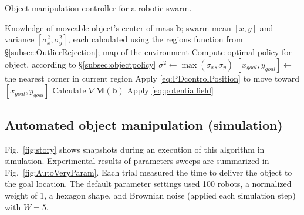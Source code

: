 \begin{algorithm}
\caption{Object-manipulation controller for a robotic swarm.}\label{alg:BlockPushing}
\begin{algorithmic}[1]
\Require Knowledge of moveable object's center of mass $\mathbf{b}$; swarm mean $[\bar{x},\bar{y}]$ and variance $[\sigma_x^2, \sigma_y^2]$, each calculated using the regions function from \S \ref{subsec:OutlierRejection};  map of the environment
\State Compute optimal policy for object, according to \S \ref{subsec:objectpolicy}
\State $\sigma^2 \gets \max{(\sigma_x,\sigma_y)}$
\State $ [x_{goal}, y_{goal}] \gets $ the nearest corner in current region
\State Apply \eqref{eq:PDcontrolPosition} to move toward $[x_{goal}, y_{goal}]$
\EndWhile
\Else  
\State Calculate $\nabla \mathbf{M}(\mathbf{b})$  
\State Apply \eqref{eq:potentialfield}   
\EndIf
\EndWhile
\end{algorithmic}
\end{algorithm}


\subsection{Automated object manipulation (simulation)}
Fig.~\ref{fig:story} shows snapshots during an execution of this algorithm in simulation. 
Experimental results of parameters sweeps are summarized in Fig.~\ref{fig:AutoVeryParam}.  Each trial measured the time to deliver the object to the goal location.  The default parameter settings used 100 robots, a normalized weight of 1, a hexagon shape, and Brownian noise (applied each simulation step) with $W=5$.  

